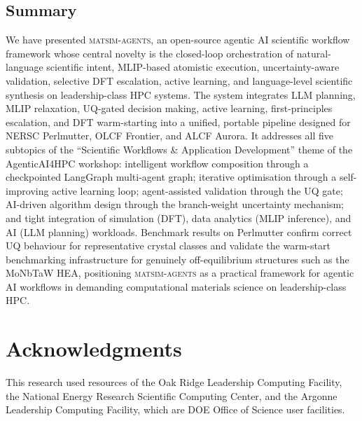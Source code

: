 \documentclass[conference]{IEEEtran}
\def\ac#1{#1}%
\def\acs#1{#1}%
\begin{document}
\subsection{Summary}
We have presented \textsc{matsim-agents}, an open-source agentic \acs{AI} scientific
workflow framework whose central novelty is the closed-loop orchestration of
natural-language scientific intent, \acs{MLIP}-based atomistic execution,
uncertainty-aware validation, selective \acs{DFT} escalation, active learning, and
language-level scientific synthesis on leadership-class \acs{HPC} systems. The system integrates \ac{LLM} planning, \acs{MLIP} relaxation, \acs{UQ}-gated
decision making, active learning, first-principles escalation, and \acs{DFT}
warm-starting into a unified, portable pipeline designed for \acs{NERSC} Perlmutter,
\acs{OLCF} Frontier, and \acs{ALCF} Aurora. It
addresses all five subtopics of the ``Scientific Workflows \& Application
Development'' theme of the AgenticAI4HPC workshop: intelligent workflow
composition through a checkpointed LangGraph multi-agent graph; iterative
optimisation through a self-improving active learning loop; agent-assisted
validation through the \acs{UQ} gate; \acs{AI}-driven algorithm design through the
branch-weight uncertainty mechanism; and tight integration of simulation (\acs{DFT}),
data analytics (\acs{MLIP} inference), and \acs{AI} (\acs{LLM} planning) workloads.
Benchmark results on Perlmutter confirm correct \acs{UQ} behaviour for representative
crystal classes and validate the warm-start benchmarking infrastructure for
genuinely off-equilibrium structures such as the MoNbTaW \acs{HEA}, positioning
\textsc{matsim-agents} as a practical framework for agentic \acs{AI} workflows in
demanding computational materials science on leadership-class \acs{HPC}.

\section*{Acknowledgments}
This research used resources of the Oak Ridge Leadership Computing Facility,
the National Energy Research Scientific Computing Center, and the Argonne
Leadership Computing Facility, which are \acs{DOE} Office of Science user facilities.



\end{document}
